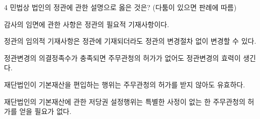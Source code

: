 \begin{question}{4}
민법상 법인의 정관에 관한 설명으로 옳은 것은? (다툼이 있으면 판례에 따름)
\begin{choices}
  \item 감사의 임면에 관한 사항은 정관의 필요적 기재사항이다.
  \item 정관의 임의적 기재사항은 정관에 기재되더라도 정관의 변경절차 없이 변경할 수 있다.
  \item 정관변경의 의결정족수가 충족되면 주무관청의 허가가 없어도 정관변경의 효력이 생긴다.
  \item 재단법인이 기본재산을 편입하는 행위는 주무관청의 허가를 받지 않아도 유효하다.
  \item 재단법인의 기본재산에 관한 저당권 설정행위는 특별한 사정이 없는 한 주무관청의 허가를 얻을 필요가 없다.
\end{choices}
\end{question}
